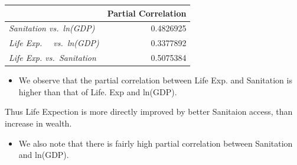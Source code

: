 \documentclass[
]{article}
\newenvironment{Shaded}{}{}
\newcommand{\AttributeTok}[1]{\textcolor[rgb]{0.84,0.60,0.13}{#1}}
\newcommand{\DecValTok}[1]{\textcolor[rgb]{0.96,0.45,0.00}{#1}}
\newcommand{\FunctionTok}[1]{\textcolor[rgb]{0.41,0.62,0.42}{#1}}
\newcommand{\NormalTok}[1]{\textcolor[rgb]{0.24,0.22,0.21}{#1}}
\newcommand{\OtherTok}[1]{\textcolor[rgb]{0.41,0.62,0.42}{#1}}
\newcommand{\SpecialCharTok}[1]{\textcolor[rgb]{0.69,0.38,0.53}{#1}}
\newcommand{\StringTok}[1]{\textcolor[rgb]{0.60,0.59,0.10}{#1}}
\providecommand{\tightlist}{%
  \setlength{\itemsep}{0pt}\setlength{\parskip}{0pt}}\usepackage{longtable,booktabs,array}
\begin{document}
\begin{Shaded}
\end{Shaded}

\begin{longtable}[]{@{}lr@{}}
\toprule()
& Partial Correlation \\
\midrule()
\endhead
\emph{Sanitation vs.~ln(GDP)} & 0.4826925 \\
\emph{Life Exp.\(\quad\) vs.~ln(GDP)} & 0.3377892 \\
\emph{Life Exp. vs.~Sanitation} & 0.5075384 \\
\bottomrule()
\end{longtable}

\begin{itemize}
\tightlist
\item
  We observe that the partial correlation between Life Exp. and
  Sanitation is higher than that of Life. Exp and ln(GDP).
\end{itemize}

Thus Life Expection is more directly improved by better Sanitaion
access, than increase in wealth.

\begin{itemize}
\tightlist
\item
  We also note that there is fairly high partial correlation between
  Sanitation and ln(GDP).
\end{itemize}
\end{document}

